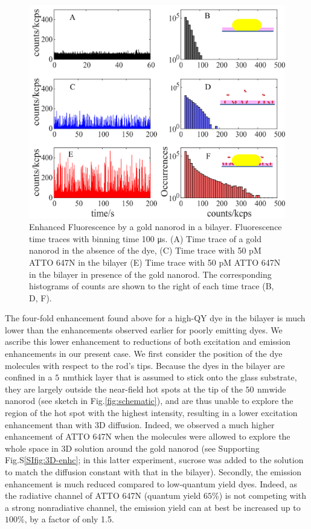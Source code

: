\documentclass[journal=jacsat,manuscript=article]{achemso}
\newcommand{\nm}{\ensuremath{\,\textrm{nm}}}
\begin{document}
\begin{figure}
	\centering
	\includegraphics[]{timetrace_hist.png}
	\caption{Enhanced Fluorescence by a gold nanorod in a bilayer. Fluorescence time traces with binning time 100 μs. (A) Time trace of a gold nanorod in the absence of the dye, (C) Time trace with 50 pM ATTO 647N in the bilayer (E) Time trace with 50 pM ATTO 647N in the bilayer in presence of the gold nanorod. The corresponding histograms of counts are shown to the right of each time trace (B, D, F).}
	\label{fig:timetrace_hist}
\end{figure}
The four-fold enhancement found above for a high-QY dye in the bilayer is much lower than the enhancements observed earlier for poorly emitting dyes.\cite{yuan2013thousandfold} We ascribe this lower enhancement to reductions of both excitation and emission enhancements in our present case. We first consider the position of the dye molecules with respect to the rod’s tips. Because the dyes in the bilayer are confined in a $5~$\nm thick layer that is assumed to stick onto the glass substrate, they are largely outside the near-field hot spots at the tip of the $50~$\nm wide nanorod (see sketch in Fig.\ref{fig:schematic}), and are thus unable to explore the region of the hot spot with the highest intensity, resulting in a lower excitation enhancement than with 3D diffusion. Indeed, we observed a much higher enhancement of ATTO 647N when the molecules were allowed to explore the whole space in 3D solution around the gold nanorod (see Supporting Fig.S\ref{SIfig:3D-enhc}; in this latter experiment, sucrose was added to the solution to match the diffusion constant with that in the bilayer). Secondly, the emission enhancement is much reduced compared to low-quantum yield dyes. Indeed, as the radiative channel of ATTO 647N (quantum yield $65$\%) is not competing with a strong nonradiative channel, the emission yield can at best be increased up to $100$\%, by a factor of only 1.5.\cite{khatua2014resonant}\\
\end{document}
